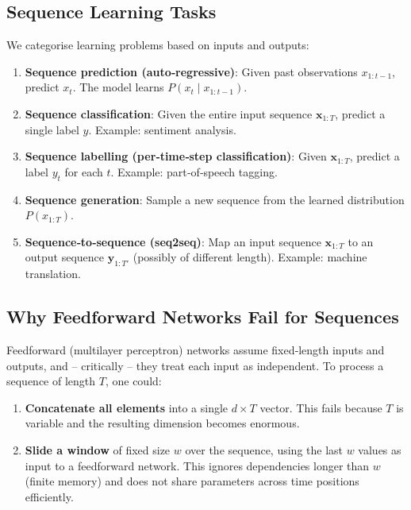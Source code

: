 \documentclass{tufte-handout}
\begin{document}
\begin{marginfigure}
\centering
{}
\caption{Continuous RNN states can represent exponentially more distinct histories than discrete HMM states of the same dimension.}
\end{marginfigure}

\subsection{Sequence Learning Tasks}

We categorise learning problems based on inputs and outputs:

\begin{enumerate}
    \item \textbf{Sequence prediction (auto‑regressive)}: Given past observations $x_{1:t-1}$, predict $x_t$. The model learns $P(x_t \mid x_{1:t-1})$.
    \item \textbf{Sequence classification}: Given the entire input sequence $\mathbf{x}_{1:T}$, predict a single label $y$. Example: sentiment analysis.
    \item \textbf{Sequence labelling (per‑time‑step classification)}: Given $\mathbf{x}_{1:T}$, predict a label $y_t$ for each $t$. Example: part‑of‑speech tagging.
    \item \textbf{Sequence generation}: Sample a new sequence from the learned distribution $P(x_{1:T})$.
    \item \textbf{Sequence‑to‑sequence (seq2seq)}: Map an input sequence $\mathbf{x}_{1:T}$ to an output sequence $\mathbf{y}_{1:T'}$ (possibly of different length). Example: machine translation.
\end{enumerate}

\subsection{Why Feedforward Networks Fail for Sequences}

Feedforward (multilayer perceptron) networks assume fixed‑length inputs and outputs, and – critically – they treat each input as independent. To process a sequence of length $T$, one could:
\begin{enumerate}
    \item \textbf{Concatenate all elements} into a single $d \times T$ vector. This fails because $T$ is variable and the resulting dimension becomes enormous.
    \item \textbf{Slide a window} of fixed size $w$ over the sequence, using the last $w$ values as input to a feedforward network. This ignores dependencies longer than $w$ (finite memory) and does not share parameters across time positions efficiently.
\end{enumerate}
\end{document}
